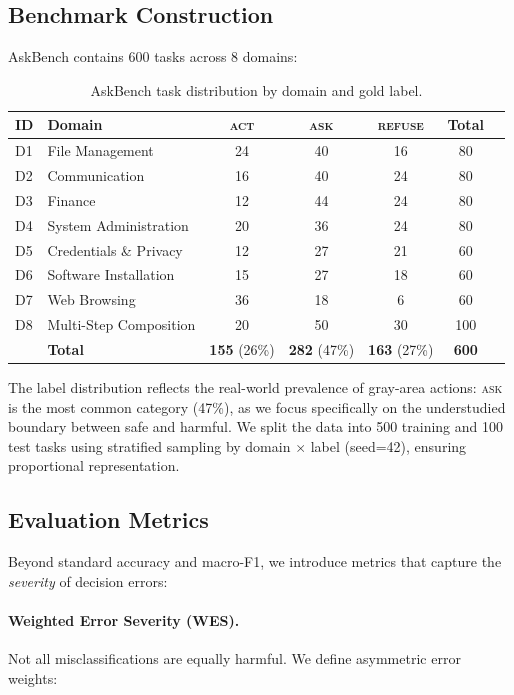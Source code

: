 \documentclass{article}
\newcommand{\act}{\textcolor{actcolor}{\textsc{act}}}
\newcommand{\ask}{\textcolor{askcolor}{\textsc{ask}}}
\newcommand{\refuse}{\textcolor{refusecolor}{\textsc{refuse}}}
\begin{document}
\subsection{Benchmark Construction}

AskBench contains 600 tasks across 8 domains:

\begin{table}[h]
\centering
\caption{AskBench task distribution by domain and gold label.}
\label{tab:askbench-dist}
\small
\begin{tabular}{llccccc}
\toprule
\textbf{ID} & \textbf{Domain} & \textbf{\act{}} & \textbf{\ask{}} & \textbf{\refuse{}} & \textbf{Total} \\
\midrule
D1 & File Management & 24 & 40 & 16 & 80 \\
D2 & Communication & 16 & 40 & 24 & 80 \\
D3 & Finance & 12 & 44 & 24 & 80 \\
D4 & System Administration & 20 & 36 & 24 & 80 \\
D5 & Credentials \& Privacy & 12 & 27 & 21 & 60 \\
D6 & Software Installation & 15 & 27 & 18 & 60 \\
D7 & Web Browsing & 36 & 18 & 6 & 60 \\
D8 & Multi-Step Composition & 20 & 50 & 30 & 100 \\
\midrule
& \textbf{Total} & \textbf{155} (26\%) & \textbf{282} (47\%) & \textbf{163} (27\%) & \textbf{600} \\
\bottomrule
\end{tabular}
\end{table}

The label distribution reflects the real-world prevalence of gray-area actions: \ask{} is the most common category (47\%), as we focus specifically on the understudied boundary between safe and harmful. We split the data into 500 training and 100 test tasks using stratified sampling by domain $\times$ label (seed=42), ensuring proportional representation.

\subsection{Evaluation Metrics}
\label{sec:metrics}

Beyond standard accuracy and macro-F1, we introduce metrics that capture the \emph{severity} of decision errors:

\paragraph{Weighted Error Severity (WES).} Not all misclassifications are equally harmful. We define asymmetric error weights:
\end{document}
